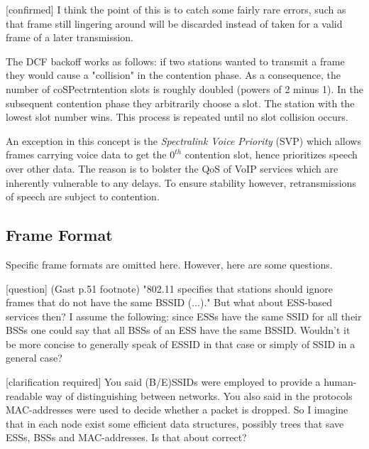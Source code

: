 \documentclass{article}
\begin{document}
	\medskip
	
	\color{red}
	[confirmed] I think the point of this is to catch some fairly rare errors, such as that frame still lingering around will be discarded instead of taken for a valid frame of a later transmission.
	\color{black}
	
	\bigskip
	
	The DCF backoff works as follows: if two stations wanted to transmit a frame they would cause a "collision" in the contention phase. As a consequence, the number of coSPectrntention slots is roughly doubled (powers of 2 minus 1). In the subsequent contention phase they arbitrarily choose a slot. The station with the lowest slot number wins. This process is repeated until no slot collision occurs.
	
	\bigskip
	
	An exception in this concept is the \emph{Spectralink Voice Priority} (SVP) which allows frames carrying voice data to get the $0^{th}$ contention slot, hence prioritizes speech over other data. The reason is to bolster the QoS of VoIP services which are inherently vulnerable to any delays. To ensure stability however, retransmissions of speech are subject to contention.
	
	\subsection{Frame Format}
	
	Specific frame formats are omitted here. However, here are some questions.
	
	\bigskip
	
	\color{blue}
	[question] (Gast p.51 footnote) "802.11 specifies that stations should ignore frames that do not have the same BSSID (...)." But what about ESS-based services then? I assume the following: since ESSs have the same SSID for all their BSSs one could say that all BSSs of an ESS have the same BSSID. Wouldn't it be more concise to generally speak of ESSID in that case or simply of SSID in a general case?
	\color{black}
	
	\bigskip
	
	\color{orange}
	[clarification required] You said (B/E)SSIDs were employed to provide a human-readable way of distinguishing between networks. You also said in the protocols MAC-addresses were used to decide whether a packet is dropped. So I imagine that in each node exist some efficient data structures, possibly trees that save ESSs, BSSs and MAC-addresses. Is that about correct?
	\color{black}
	
\end{document}
